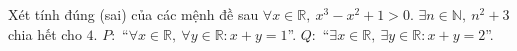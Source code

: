 \begin{ex}
Xét tính đúng (sai) của các mệnh đề sau
\choiceTF
{$\forall x\in\mathbb R,\ x^3-x^2+1>0$.}
{\True $\exists n\in\mathbb N,\ n^2+3$ chia hết cho $4$.}
{$P\colon$ ``$\forall x\in\mathbb R,\ \forall y\in\mathbb R\colon x+y=1$''.}
{\True $Q\colon$ ``$\exists x\in\mathbb R,\ \exists y\in\mathbb R\colon x+y=2$''.}
\end{ex}
